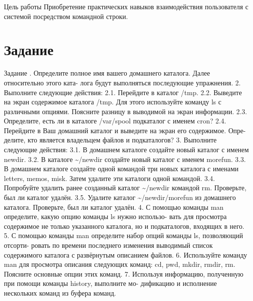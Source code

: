 \documentclass[
  ignorenonframetext,
  aspectratio=169,
  russian,
]{beamer}
\begin{document}
\begin{frame}{Цель работы}
Приобретение практических навыков взаимодействия пользователя с системой
посредством командной строки.
\end{frame}

\begin{frame}
\end{frame}

\section{Задание}\label{ux437ux430ux434ux430ux43dux438ux435}

\begin{frame}{Задание}
. Определите полное имя вашего домашнего каталога. Далее относительно
этого ката- лога будут выполняться последующие упражнения. 2. Выполните
следующие действия: 2.1. Перейдите в каталог /tmp. 2.2. Выведите на
экран содержимое каталога /tmp. Для этого используйте команду ls с
различными опциями. Поясните разницу в выводимой на экран информации.
2.3. Определите, есть ли в каталоге /var/spool подкаталог с именем cron?
2.4. Перейдите в Ваш домашний каталог и выведите на экран его
содержимое. Опре- делите, кто является владельцем файлов и подкаталогов?
3. Выполните следующие действия: 3.1. В домашнем каталоге создайте новый
каталог с именем newdir. 3.2. В каталоге \textasciitilde/newdir создайте
новый каталог с именем morefun. 3.3. В домашнем каталоге создайте одной
командой три новых каталога с именами letters, memos, misk. Затем
удалите эти каталоги одной командой. 3.4. Попробуйте удалить ранее
созданный каталог \textasciitilde/newdir командой rm. Проверьте, был ли
каталог удалён. 3.5. Удалите каталог \textasciitilde/newdir/morefun из
домашнего каталога. Проверьте, был ли каталог удалён. 4. С помощью
команды man определите, какую опцию команды ls нужно использо- вать для
просмотра содержимое не только указанного каталога, но и подкаталогов,
входящих в него. 5. С помощью команды man определите набор опций команды
ls, позволяющий отсорти- ровать по времени последнего изменения
выводимый список содержимого каталога с развёрнутым описанием файлов. 6.
Используйте команду man для просмотра описания следующих команд: cd,
pwd, mkdir, rmdir, rm. Поясните основные опции этих команд. 7. Используя
информацию, полученную при помощи команды history, выполните мо-
дификацию и исполнение нескольких команд из буфера команд.
\end{frame}

\begin{frame}
\end{frame}
\end{document}
